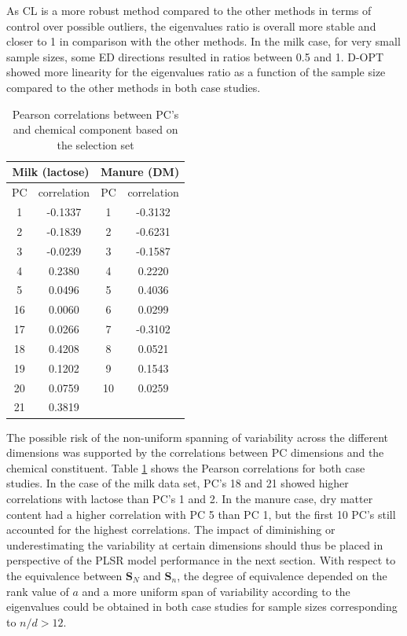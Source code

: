 \documentclass[preprint,12pt]{elsarticle}
\begin{document}
As CL is a more robust method compared to the other methods in terms of control over possible outliers, the eigenvalues ratio is overall more stable and closer to 1 in comparison with the other methods. In the milk case, for very small sample sizes, some ED directions resulted in ratios between 0.5 and 1. D-OPT showed more linearity for the eigenvalues ratio as a function of the sample size compared to the other methods in both case studies. 

\begin{table}[t]
\centering
\begin{tabular}{|cc|cc|} 
\hline
\multicolumn{2}{|c|}{Milk (lactose)} & \multicolumn{2}{|c|}{Manure (DM)}\\
\hline
PC	& correlation	&  PC & correlation	\\
\hline
  1 & -0.1337 & 1 & -0.3132 \\
  2 & -0.1839 & 2 & -0.6231 \\
  3 & -0.0239 & 3 & -0.1587 \\
  4 &  0.2380 & 4 &  0.2220 \\
  5 &  0.0496 & 5 &  0.4036 \\
 16 &  0.0060 & 6 &  0.0299 \\
 17 &  0.0266 & 7 & -0.3102 \\
 18 &  0.4208 & 8 & 0.0521 \\
 19 &  0.1202 & 9 & 0.1543 \\
 20 &  0.0759 & 10& 0.0259 \\
 21 &  0.3819 &  & \\
 \hline
\end{tabular}
\caption{Pearson correlations between PC's and chemical component based on the selection set}
\label{tab_correlations}
\end{table}

The possible risk of the non-uniform spanning of variability across the different dimensions was supported by the correlations between PC dimensions and the chemical constituent. Table \ref{tab_correlations} shows the Pearson correlations for both case studies. In the case of the milk data set, PC's 18 and 21 showed higher correlations with lactose than PC's 1 and 2. In the manure case, dry matter content had a higher correlation with PC 5 than PC 1, but the first 10 PC's still accounted for the highest correlations. The impact of diminishing or underestimating the variability at certain dimensions should thus be placed in perspective of the PLSR model performance in the next section. With respect to the equivalence between $\mathbf{S}_N$ and $\mathbf{S}_n$, the degree of equivalence depended on the rank value of $a$ and a more uniform span of variability according to the eigenvalues could be obtained in both case studies for sample sizes corresponding to $n/d>12$.  
\end{document}
